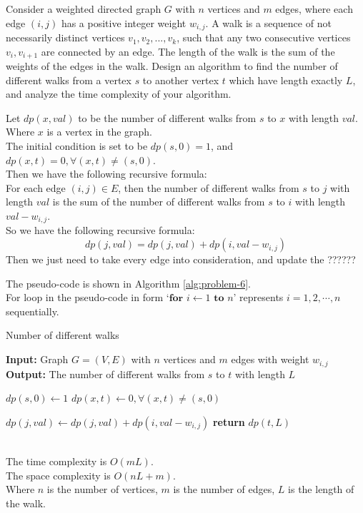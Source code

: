 \problem{}
Consider a weighted directed graph $G$ with $n$ vertices and $m$ edges, where each edge $(i,j)$ has a positive integer weight $w_{i, j}$. A  walk is a sequence of not necessarily distinct vertices $v_1, v_2, ..., v_k$, such that any two consecutive vertices $v_i, v_{i+1}$ are connected by an edge. The length of the walk is the sum of the weights of the edges in the walk.  Design an algorithm to find the number of different walks from a vertex $s$ to another vertex $t$ which have length exactly $L$, and analyze the time complexity of your algorithm. 

\solution{}

Let $dp(x, val)$ to be the number of different walks from $s$ to $x$ with length $val$.\\
Where $x$ is a vertex in the graph.\\
The initial condition is set to be $dp(s,0)=1$, and $dp(x,t)=0, \forall (x,t)\neq (s,0)$.\\
Then we have the following recursive formula:\\
For each edge $(i,j)\in E$, then the number of different walks from $s$ to $j$ with length $val$ is the sum of the number of different walks from $s$ to $i$ with length $val-w_{i,j}$.\\
So we have the following recursive formula:
$$dp(j,val) = dp(j,val)+dp(i, val-w_{i,j})$$
Then we just need to take every edge into consideration, and update the 
??????

The pseudo-code is shown in Algorithm \ref{alg:problem-6}.\\
For loop in the pseudo-code in form `$\textbf{for } i \gets 1 \textbf{ to } n$' represents $i=1,2,\cdots,n$ sequentially.
\begin{algorithm}
    \caption{Number of different walks}
    \begin{algorithmic}[1]
    \State \textbf{Input:} Graph $G=(V,E)$ with $n$ vertices and $m$ edges with weight $w_{i,j}$
    \State \textbf{Output:} The number of different walks from $s$ to $t$ with length $L$
    
    \State $dp(s,0) \gets 1$
    \State $dp(x,t) \gets 0, \forall (x,t)\neq (s,0)$
    
                \State $dp(j,val) \gets dp(j,val)+dp(i, val-w_{i,j})$
            \EndIf
        \EndFor
    \EndFor
    \State \textbf{return} $dp(t,L)$
    \end{algorithmic}
    \label{alg:problem-6}
\end{algorithm}\\
The time complexity is $O(mL)$.\\
The space complexity is $O(nL+m)$.\\
Where $n$ is the number of vertices, $m$ is the number of edges, $L$ is the length of the walk.\\